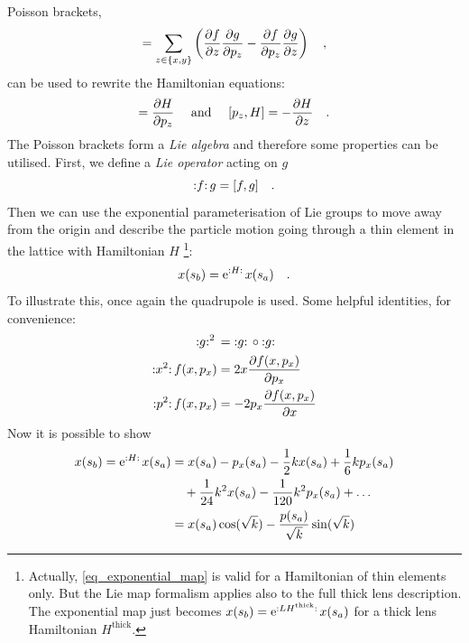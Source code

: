 Poisson brackets,
%
\begin{equation}
    [f,g] = 
    \sum\limits_{z\in\{x,y\}}
    \left(
    \frac{\partial f}{\partial z} \frac{\partial g}{\partial p_z}
    - \frac{\partial f}{\partial p_z}\frac{\partial g}{\partial z}
    \right)
    \komma
\end{equation}
%
can be used to rewrite the Hamiltonian equations:
\begin{align}
    [z, H] = \frac{\partial H}{\partial p_z}\quad\text{ and }\quad
    [p_z, H] = -\frac{\partial H}{\partial z}
    \fstop
\end{align}
%
The Poisson brackets form a \emph{Lie algebra} and therefore some properties can be utilised.
First, we define a \emph{Lie operator} acting on $g$
\begin{equation}
    {:}f{:}\,g = [f,g]
    \quad .
\end{equation}
Then we can use the exponential parameterisation of Lie groups to move away from the origin
\cite{Georgi1982} and describe the particle motion going through a thin element in the lattice
with Hamiltonian $H$%
\footnote{
    Actually, \eqref{eq_exponential_map} is valid for a Hamiltonian of thin elements only.
    But the Lie map formalism applies also to the full thick lens description. The exponential
    map just becomes 
    $x(s_b) = \text{e}^{{:}LH^\text{thick}{:}\,}x(s_a)$ for a thick lens Hamiltonian $H^\text{thick}$.
}:
%
\begin{equation}
    x(s_b) = \text{e}^{{:}H{:}\,}x(s_a)
    \label{eq_exponential_map}
    \quad .
\end{equation}
%
To illustrate this, once again the quadrupole is used. Some helpful identities, for convenience:
\begin{align}
    {:}g{:}^{2}\, &= {:}g{:}\,\circ{:}g{:}\,\notag \\
    {:}x^2{:}\, f(x,p_x) &= 2x\frac{\partial f(x,p_x)}{\partial p_x} \notag \\
    {:}p^2{:}\, f(x,p_x) &= -2p_x\frac{\partial f(x,p_x)}{\partial x}
\end{align}
%
Now it is possible to show
\begin{align}
    x(s_b) = \text{e}^{{:}H{:}\,} x(s_a) &= x(s_a) - p_x(s_a)
        - \frac{1}{2}kx(s_a) + \frac{1}{6}kp_x(s_a)
        \notag \\
        &\quad + \frac{1}{24}k^2x(s_a) - \frac{1}{120}k^2p_x(s_a)
        + \ldots
        \notag \\
       &= x(s_a) \cos(\sqrt{k}) - \frac{p(s_a)}{\sqrt{k}} \sin(\sqrt{k})
\end{align}
